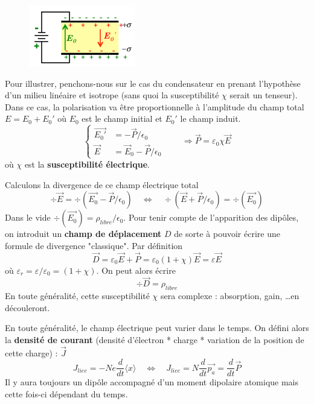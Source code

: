 	\begin{figure}
	\vspace{-5mm}
	\includegraphics[scale=0.7]{ch2/image2.png}
	\end{figure}
	Pour illustrer, penchons-nous sur le cas du condensateur en prenant l'hypothèse d'un milieu linéaire et 
	isotrope (sans quoi la susceptibilité $\chi$ serait un tenseur). Dans ce cas, la polarisation va être
	 proportionnelle à l'amplitude du champ total $E=E_0+E_0'$ où $E_0$ est le champ initial et $E_0'$ le 
	 champ induit.
	 \begin{equation}
	 \left\{\begin{array}{ll}
	 \vec{E_0'} &= -\vec P/\epsilon_0\\
	 \vec E &= \vec E_0-\vec P/\epsilon_0
	 \end{array}\right.\qquad\Rightarrow \vec{P} = \varepsilon_0\chi\vec{E}
	 \end{equation}
	où $\chi$ est la \textbf{susceptibilité électrique}.
	
	Calculons la divergence de ce champ électrique total
	\begin{equation}
	\div \vec{E} = \div(\vec{E_0}-\vec{P}/\epsilon_0)\quad \Leftrightarrow\quad \div(\vec{E}+\vec{P}/\epsilon_0) 
	= \div(\vec{E_0})
	\end{equation}
	Dans le vide $\div(\vec{E_0}) = \rho_{libre}/\epsilon_0$. Pour tenir compte de l'apparition des dipôles, 
	on introduit un \textbf{champ de déplacement} $D$ de sorte à pouvoir écrire une formule de divergence 
	"classique". Par définition
	\begin{equation}
	\vec{D} = \varepsilon_0\vec{E}+ \vec{P} = \varepsilon_0(1+\chi)\vec{E} = \varepsilon\vec{E}
	\end{equation}
	où $\varepsilon_r = \varepsilon/\varepsilon_0 = (1+\chi)$.	On peut alors écrire
	\begin{equation}
	\div\vec{D} = \rho_{libre}
	\end{equation}
	En toute généralité, cette susceptibilité $\chi$ sera complexe : absorption, gain, \dots en découleront.
	
	
	En toute généralité, le champ électrique peut varier dans le temps. On défini alors la \textbf{densité de courant} (densité d'électron * charge * variation de la position de cette charge) :
	$\vec{J}$
	\begin{equation}
	J_{liee} = -Ne\dfrac{d}{dt}\langle x \rangle \quad\Leftrightarrow\quad J_{liee} = N\dfrac{d}{dt}\vec{p_a} =
	\dfrac{d}{dt}\vec{P}
	\end{equation}
	Il y aura toujours un dipôle accompagné d'un moment dipolaire atomique mais cette fois-ci dépendant du temps.\\
	
